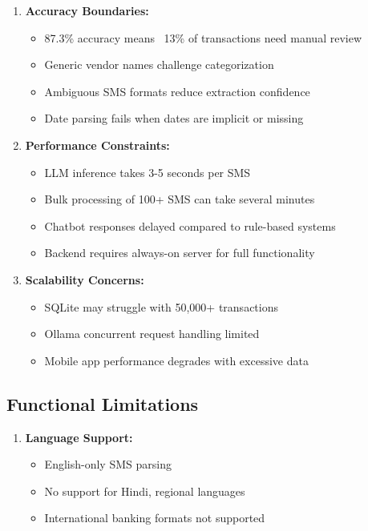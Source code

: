 \documentclass[11pt,a4paper]{report}
\begin{document}
\begin{itemize}
\begin{enumerate}
    \item \textbf{Accuracy Boundaries:}
    \begin{itemize}
        \item 87.3\% accuracy means ~13\% of transactions need manual review
        \item Generic vendor names challenge categorization
        \item Ambiguous SMS formats reduce extraction confidence
        \item Date parsing fails when dates are implicit or missing
    \end{itemize}
    
    \item \textbf{Performance Constraints:}
    \begin{itemize}
        \item LLM inference takes 3-5 seconds per SMS
        \item Bulk processing of 100+ SMS can take several minutes
        \item Chatbot responses delayed compared to rule-based systems
        \item Backend requires always-on server for full functionality
    \end{itemize}
    
    \item \textbf{Scalability Concerns:}
    \begin{itemize}
        \item SQLite may struggle with 50,000+ transactions
        \item Ollama concurrent request handling limited
        \item Mobile app performance degrades with excessive data
    \end{itemize}
\end{enumerate}

\subsection{Functional Limitations}

\begin{enumerate}
    \item \textbf{Language Support:}
    \begin{itemize}
        \item English-only SMS parsing
        \item No support for Hindi, regional languages
        \item International banking formats not supported
    \end{itemize}
    

\end{enumerate}
\end{itemize}
\end{document}
